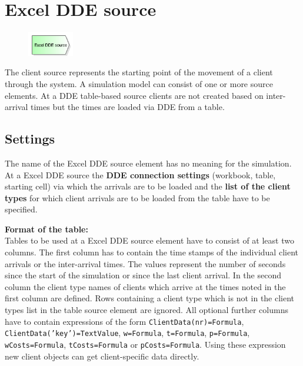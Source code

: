 \section{Excel DDE source}
\label{ref:ModelElementSourceDDE}

\begin{figure}
\vspace{-22pt}
\includegraphics[width=2cm]{imageModelElementSourceDDE.png}
\vspace{-22pt}
\end{figure}

The client source represents the starting point of the movement of a client through the system.
A simulation model can consist of one or more source elements.
At a DDE table-based source clients are not created based on inter-arrival times but the
times are loaded via DDE from a table.

\subsection*{Settings}

The name of the Excel DDE source element has no meaning for the simulation.
At a Excel DDE source the \textbf{DDE connection settings}
(workbook, table, starting cell) via which the arrivals are to be loaded and the
\textbf{list of the client types} for which client
arrivals are to be loaded from the table have to be specified.

\textbf{Format of the table:}~\\
Tables to be used at a Excel DDE source element have to consist of at least two columns.
The first column has to contain the time stamps of the individual client arrivals
or the inter-arrival times. The values represent the number of seconds since the
start of the simulation or since the last client arrival.
In the second column the client type names of clients which arrive at the times
noted in the first column are defined. Rows containing a client type which is
not in the client types list in the table source element are ignored.
All optional further columns have to contain expressions of the form
\texttt{ClientData(nr)=Formula}, \texttt{ClientData('key')=TextValue},
\texttt{w=Formula}, \texttt{t=Formula}, \texttt{p=Formula},
\texttt{wCosts=Formula}, \texttt{tCosts=Formula} or \texttt{pCosts=Formula}.
Using these expression new client objects can get client-specific data directly.



